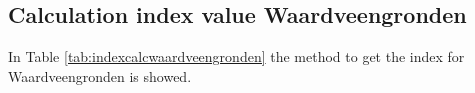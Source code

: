 {%




\clearpage

\begin{appendices}

\appendixpage

\chapter{Calculation index value Waardveengronden}
\label{app:calcwaardveengrond}

In Table \ref{tab:indexcalcwaardveengronden} the method to get the index for Waardveengronden is showed. 


\end{appendices}}
